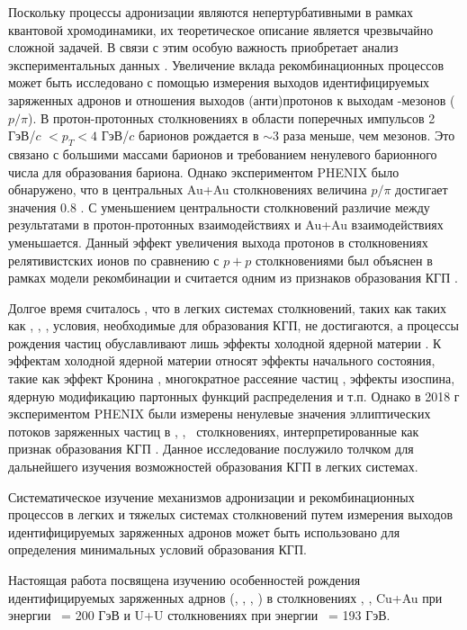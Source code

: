 Поскольку процессы адронизации являются непертурбативными в рамках квантовой хромодинамики, их теоретическое описание является чрезвычайно сложной задачей. В связи с этим особую важность приобретает анализ экспериментальных данных \autocite{nucleus2020}. Увеличение вклада рекомбинационных процессов может быть исследовано с помощью измерения выходов идентифицируемых заряженных адронов и отношения выходов (анти)протонов к выходам  \pipm-мезонов ($p/\pi$). 
В протон-протонных столкновениях в области поперечных импульсов 2 ГэВ/$c$ $<p_{T}<4$ ГэВ/$c$ барионов рождается в $\sim$3 раза меньше, чем мезонов. Это связано с большими массами барионов и требованием ненулевого барионного числа для образования бариона. Однако экспериментом PHENIX \cite{PHENIXoverview} было обнаружено, что в центральных Au+Au столкновениях величина $p/\pi$ достигает значения 0.8 \cite{p2piRatio_130GeV, p2piRatio_2003}. С уменьшением центральности столкновений различие между результатами в протон-протонных взаимодействиях и Au+Au взаимодействиях уменьшается.  
Данный эффект увеличения выхода протонов в столкновениях релятивистских ионов по сравнению с $p+p$ столкновениями был объяснен в рамках модели рекомбинации и считается одним из признаков образования КГП \cite{BaryonPuzzleHeavy, Recombination1, Recombination2}.

Долгое время считалось \cite{PHENIX_Nature,CNM}, что в легких системах столкновений, таких как таких как \pal, \heau, \dau, условия, необходимые для образования КГП, не достигаются, а процессы рождения частиц обуславливают лишь эффекты холодной ядерной материи \cite{CNM, phi_dAu, QGP_small_syst}. К эффектам холодной ядерной материи относят эффекты начального состояния, такие как эффект Кронина \cite{Cronin, Cronin_hadrons_pp_dAu_AuAu}, многократное рассеяние частиц \cite{MPI1, MPI2}, эффекты изоспина, ядерную модификацию партонных функций  распределения \cite{PDF1, PDF2} и т.п. Однако в 2018 г экспериментом PHENIX были измерены ненулевые значения эллиптических потоков заряженных частиц в \pal, \heau, \dau \ столкновениях, интерпретированные как признак образования КГП \cite{PHENIX_Nature}. Данное исследование послужило толчком для дальнейшего изучения возможностей образования КГП в легких системах. 

Систематическое изучение механизмов адронизации и рекомбинационных процессов в легких и тяжелых системах столкновений путем измерения выходов идентифицируемых заряженных адронов может быть использовано для определения минимальных условий образования КГП. 
 
Настоящая работа посвящена изучению особенностей рождения идентифицируемых заряженных адрнов (\pipm, \Kpm, \prot, \aprot) в столкновениях \pal, \heau, Cu+Au при энергии \sqsn \ = 200 ГэВ и U+U столкновениях при энергии \sqsn \ = 193 ГэВ.

